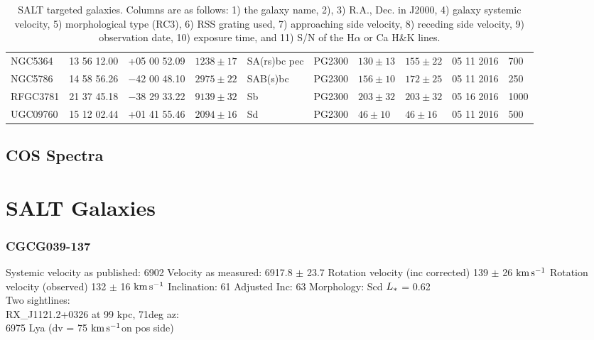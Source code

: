 \documentclass[iop]{emulateapj-rtx4}
\newcommand{\kms}{$\rm km\, s^{-1}$}
\begin{document}
\begin{table}[ht]
\begin{center}
\begin{tabular}{l l l l l l l l l l}
 NGC5364	 	& 13 56 12.00		& +05 00 52.09		& $1238 \pm17$	& SA(rs)bc pec	& PG2300		& $130 \pm 13$	& $155 \pm 22$		& 05 11 2016	& 700			\\ %
 
 NGC5786	 	& 14 58 56.26		& $-$42 00 48.10	& $2975 \pm22$	& SAB(s)bc	& PG2300		& $156 \pm 10$	& $172 \pm 25$		& 05 11 2016	& 250			\\ %

 RFGC3781	 	& 21 37 45.18		& $-$38 29 33.22	& $9139 \pm32$	& Sb			& PG2300		& $203 \pm 32$	& $203 \pm 32$		& 05 16 2016	& 1000			\\ %

 UGC09760	 	& 15 12 02.44		& +01 41 55.46		& $2094 \pm16$	& Sd			& PG2300		& $46 \pm 10$		& $46 \pm 16$			& 05 11 2016	& 500			\\


 \hline

\end{tabular}
\end{center}
  \caption{\small{SALT targeted galaxies. Columns are as follows: 1) the galaxy name, 2), 3) R.A., Dec. in J2000, 4) galaxy systemic velocity, 5) morphological type (RC3), 6) RSS grating used, 7) approaching side velocity, 8) receding side velocity, 9) observation date, 10) exposure time, and 11) S/N of the H$\alpha$ or Ca H\&K lines.}}
  \label{salt_targets}
\end{table}

\subsection{COS Spectra}


\section{SALT Galaxies}

\subsubsection{CGCG039-137}
Systemic velocity as published: 6902
Velocity as measured: 6917.8 $\pm$ 23.7
Rotation velocity (inc corrected) 139 $\pm$ 26 \kms
Rotation velocity (observed) 132 $\pm$ 16 \kms
Inclination: 61
Adjusted Inc: 63
Morphology: Scd
$L_{\**}$ = 0.62 \\

Two sightlines: \\
RX\_J1121.2+0326 at 99 kpc, 71deg az: \\
6975 Lya (dv = 75 \kms on pos side)
\end{document}
